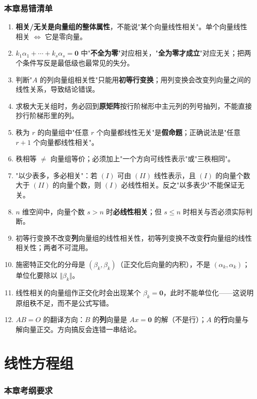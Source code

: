 \documentclass[11pt,openany,UTF8]{ctexbook}
\begin{document}
\subsection*{本章易错清单}

\begin{enumerate}
\item \textbf{相关/无关是向量组的整体属性}，不能说"某个向量线性相关"。单个向量线性相关 $\iff$ 它是零向量。
\item $k_1\alpha_1+\cdots+k_s\alpha_s=\mathbf{0}$ 中"\textbf{不全为零}"对应相关，"\textbf{全为零才成立}"对应无关；把两个条件写反是最低级也最常见的失分。
\item 判断"$A$ 的列向量组相关性"只能用\textbf{初等行变换}；用列变换会改变列向量之间的线性关系，导致结论错误。
\item 求极大无关组时，务必回到\textbf{原矩阵}按行阶梯形中主元列的列号抽列，不能直接抄行阶梯形里的列。
\item 秩为 $r$ 的向量组中"任意 $r$ 个向量都线性无关"是\textbf{假命题}；正确说法是"任意 $r+1$ 个向量都线性相关"。
\item 秩相等 $\ne$ 向量组等价；必须加上"一个方向可线性表示"或"三秩相同"。
\item "以少表多，多必相关"：若 $(I)$ 可由 $(II)$ 线性表示，且 $(I)$ 的向量个数大于 $(II)$ 的向量个数，则 $(I)$ 必线性相关。反之"以多表少"不能保证无关。
\item $n$ 维空间中，向量个数 $s>n$ 时\textbf{必线性相关}；但 $s\le n$ 时相关与否必须实际判断。
\item 初等行变换不改变\textbf{列}向量组的线性相关性，初等列变换不改变\textbf{行}向量组的线性相关性；两者不可混用。
\item 施密特正交化的分母是 $(\beta_k,\beta_k)$（正交化后向量的内积），不是 $(\alpha_k,\alpha_k)$；单位化要除以 $\Vert\beta_k\Vert$。
\item 线性相关的向量组作正交化时会出现某个 $\beta_k=\mathbf{0}$，此时不能单位化——这说明原组秩不足，而不是公式写错。
\item $AB=O$ 的翻译方向：$B$ 的\textbf{列}向量是 $Ax=\mathbf{0}$ 的解（不是行）；$A$ 的\textbf{行}向量与解向量正交。方向搞反会连错一串结论。
\end{enumerate}
\chapter{线性方程组}
\subsection*{本章考纲要求}
\end{document}

